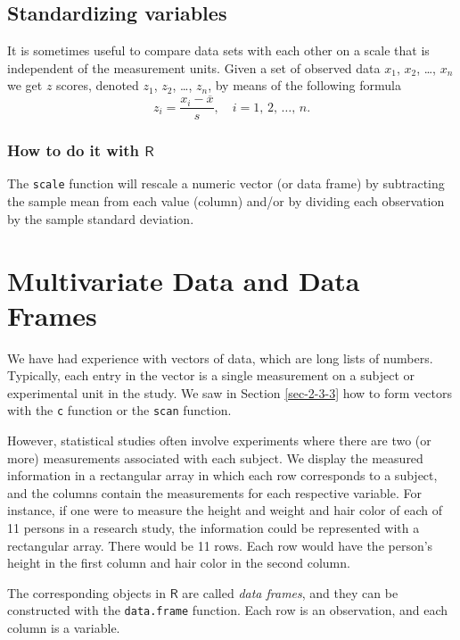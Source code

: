 \documentclass[captions=tableheading]{scrbook}
\begin{document}
\subsection{Standardizing variables}
\label{sec-3-4-5}


It is sometimes useful to compare data sets with each other on a scale that is independent of the measurement units. Given a set of observed data \(x_{1}\), \(x_{2}\), \ldots{}, \(x_{n}\) we get \(z\) scores, denoted \(z_{1}\), \(z_{2}\), \ldots{}, \(z_{n}\), by means of the following formula
\[
z_{i}=\frac{x_{i}-\overline{x}}{s},\quad i=1,\,2,\,\ldots,\, n.
\]
\subsubsection{How to do it with \(\mathsf{R}\)}
\label{sec-3-4-5-1}


The \texttt{scale} function will rescale a numeric vector (or data frame) by subtracting the sample mean from each value (column) and/or by dividing each observation by the sample standard deviation.
\section{Multivariate Data and Data Frames}
\label{sec-3-5}
\label{sec-multivariate-data}


We have had experience with vectors of data, which are long lists of numbers. Typically, each entry in the vector is a single measurement on a subject or experimental unit in the study. We saw in Section \ref{sec-2-3-3} how to form vectors with the \texttt{c} function or the \texttt{scan} function. 

However, statistical studies often involve experiments where there are two (or more) measurements associated with each subject. We display the measured information in a rectangular array in which each row corresponds to a subject, and the columns contain the measurements for each respective variable. For instance, if one were to measure the height and weight and hair color of each of 11 persons in a research study, the information could be represented with a rectangular array. There would be 11 rows. Each row would have the person's height in the first column and hair color in the second column.

The corresponding objects in \(\mathsf{R}\) are called \emph{data frames}, and they can be constructed with the \texttt{data.frame} function. Each row is an observation, and each column is a variable.
\end{document}
